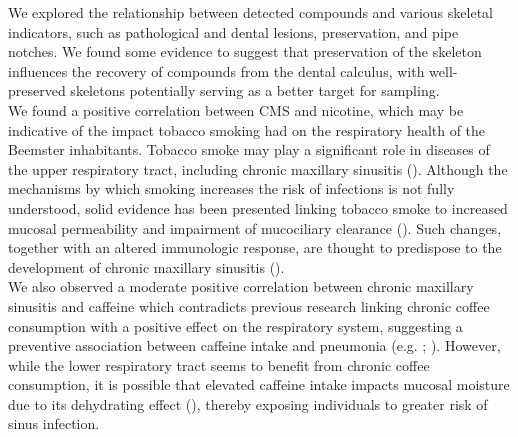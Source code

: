 \documentclass[
  11pt,
  leqno]{scrartcl}
\begin{document}
We explored the relationship between detected compounds and various
skeletal indicators, such as pathological and dental lesions,
preservation, and pipe notches. We found some evidence to suggest that
preservation of the skeleton influences the recovery of compounds from
the dental calculus, with well-preserved skeletons potentially serving
as a better target for sampling.\\
We found a positive correlation between CMS and nicotine, which may be
indicative of the impact tobacco smoking had on the respiratory health
of the Beemster inhabitants. Tobacco smoke may play a significant role
in diseases of the upper respiratory tract, including chronic maxillary
sinusitis ().
Although the mechanisms by which smoking increases the risk of
infections is not fully understood, solid evidence has been presented
linking tobacco smoke to increased mucosal permeability and impairment
of mucociliary clearance
().
Such changes, together with an altered immunologic response, are thought
to predispose to the development of chronic maxillary sinusitis
().\\
We also observed a moderate positive correlation between chronic
maxillary sinusitis and caffeine which contradicts previous research
linking chronic coffee consumption with a positive effect on the
respiratory system, suggesting a preventive association between caffeine
intake and pneumonia (e.g. ; ). However, while the lower respiratory tract seems to benefit from
chronic coffee consumption, it is possible that elevated caffeine intake
impacts mucosal moisture due to its dehydrating effect
(),
thereby exposing individuals to greater risk of sinus infection.
\end{document}
